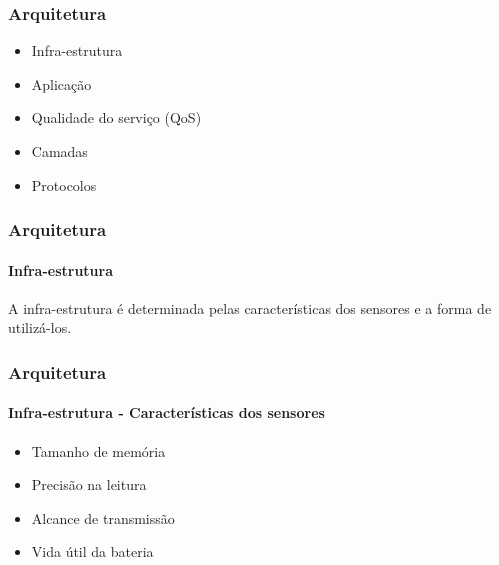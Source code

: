 \documentclass[notes]{beamer}
\begin{document}
\begin{frame}
\label{slide_30}
\frametitle{Arquitetura}

\begin{block}

\begin{itemize}

\item Infra-estrutura \pause

\item Aplicação \pause

\item Qualidade do serviço (QoS) \pause

\item Camadas \pause

\item Protocolos 

\end{itemize}

\end{block}

\end{frame}

\begin{frame}
\label{slide_31}
\frametitle{Arquitetura}
\framesubtitle{Infra-estrutura}

\begin{block}

A infra-estrutura é determinada pelas características dos sensores e a forma de utilizá-los.

\end{block}

\end{frame}

\begin{frame}
\label{slide_32}
\frametitle{Arquitetura}
\framesubtitle{Infra-estrutura - Características dos sensores}

\begin{block}

\begin{itemize}

\item Tamanho de memória \pause
\item Precisão na leitura \pause
\item Alcance de transmissão \pause
\item Vida útil da bateria 

\end{itemize}

\end{block}

\end{frame}
\end{document}
